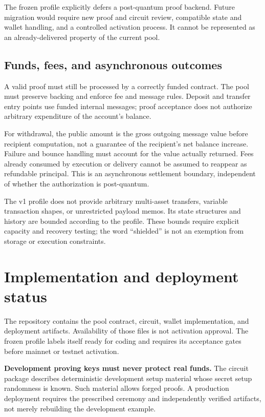 \documentclass[11pt,a4paper]{article}
\begin{document}
The frozen profile explicitly defers a post-quantum proof backend. Future
migration would require new proof and circuit review, compatible state and
wallet handling, and a controlled activation process. It cannot be represented
as an already-delivered property of the current pool.

\subsection{Funds, fees, and asynchronous outcomes}
A valid proof must still be processed by a correctly funded contract. The
pool must preserve backing and enforce fee and message rules. Deposit and
transfer entry points use funded internal messages; proof acceptance does
not authorize arbitrary expenditure of the account's balance.

For withdrawal, the public amount is the gross outgoing message value before
recipient computation, not a guarantee of the recipient's net balance
increase. Failure and bounce handling must account for the value actually
returned. Fees already consumed by execution or delivery cannot be assumed
to reappear as refundable principal. This is an asynchronous settlement
boundary, independent of whether the authorization is post-quantum.

The v1 profile does not provide arbitrary multi-asset transfers, variable
transaction shapes, or unrestricted payload memos. Its state structures and
history are bounded according to the profile. These bounds require explicit
capacity and recovery testing; the word ``shielded'' is not an exemption
from storage or execution constraints.

\section{Implementation and deployment status}
The repository contains the pool contract, circuit, wallet implementation,
and deployment artifacts. Availability of those files is not activation
approval. The frozen profile labels itself ready for coding and requires its
acceptance gates before mainnet or testnet activation.

\textbf{Development proving keys must never protect real funds.} The circuit
package describes deterministic development setup material whose secret
setup randomness is known. Such material allows forged proofs. A production
deployment requires the prescribed ceremony and independently verified
artifacts, not merely rebuilding the development example.
\end{document}

